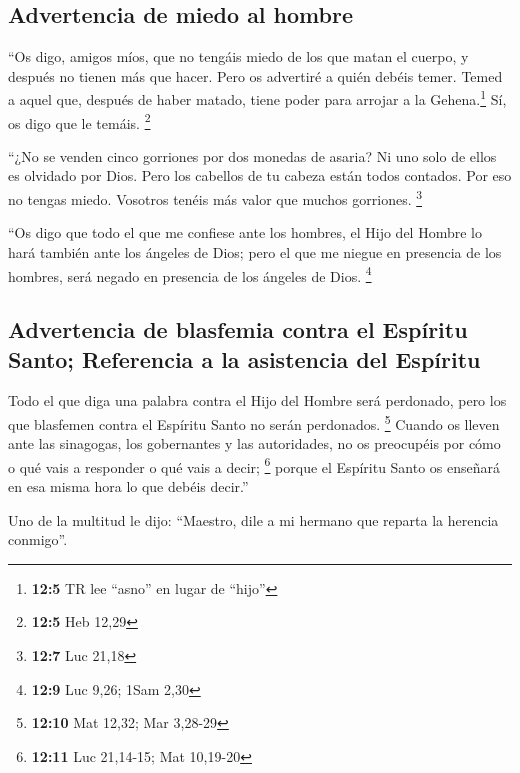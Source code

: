 \hypertarget{advertencia-de-miedo-al-hombre}{%
\subsection{Advertencia de miedo al
hombre}\label{advertencia-de-miedo-al-hombre}}

 ``Os digo, amigos míos, que no tengáis miedo de los que
matan el cuerpo, y después no tienen más que hacer.  Pero
os advertiré a quién debéis temer. Temed a aquel que, después de haber
matado, tiene poder para arrojar a la Gehena.\footnote{\textbf{12:5} TR
  lee ``asno'' en lugar de ``hijo''} Sí, os digo que le temáis.
\footnote{\textbf{12:5} Heb 12,29}

 ``¿No se venden cinco gorriones por dos monedas de
asaria? Ni uno solo de ellos es olvidado por Dios.  Pero
los cabellos de tu cabeza están todos contados. Por eso no tengas miedo.
Vosotros tenéis más valor que muchos gorriones. \footnote{\textbf{12:7}
  Luc 21,18}

 ``Os digo que todo el que me confiese ante los hombres,
el Hijo del Hombre lo hará también ante los ángeles de Dios;
 pero el que me niegue en presencia de los hombres, será
negado en presencia de los ángeles de Dios. \footnote{\textbf{12:9} Luc
  9,26; 1Sam 2,30}

\hypertarget{advertencia-de-blasfemia-contra-el-espuxedritu-santo-referencia-a-la-asistencia-del-espuxedritu}{%
\subsection{Advertencia de blasfemia contra el Espíritu Santo;
Referencia a la asistencia del
Espíritu}\label{advertencia-de-blasfemia-contra-el-espuxedritu-santo-referencia-a-la-asistencia-del-espuxedritu}}

 Todo el que diga una palabra contra el Hijo del Hombre
será perdonado, pero los que blasfemen contra el Espíritu Santo no serán
perdonados. \footnote{\textbf{12:10} Mat 12,32; Mar 3,28-29}
 Cuando os lleven ante las sinagogas, los gobernantes y
las autoridades, no os preocupéis por cómo o qué vais a responder o qué
vais a decir; \footnote{\textbf{12:11} Luc 21,14-15; Mat 10,19-20}
 porque el Espíritu Santo os enseñará en esa misma hora
lo que debéis decir.''

 Uno de la multitud le dijo: ``Maestro, dile a mi hermano
que reparta la herencia conmigo''.

